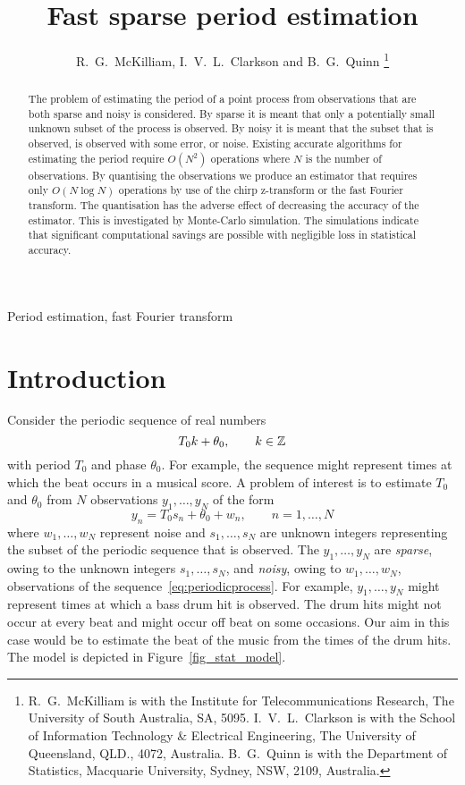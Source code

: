 \documentclass[10pt,twocolumn,twoside]{IEEEtran}
\title{Fast sparse period estimation}
\author{R.~G.~McKilliam, I.~V.~L.~Clarkson and B.~G.~Quinn    
\thanks{
R.~G.~McKilliam is with the Institute for Telecommunications Research, The University of South Australia, SA, 5095.  I.~V.~L.~Clarkson is with the School of Information Technology \& Electrical Engineering, The University of Queensland, QLD., 4072, Australia.  B.~G.~Quinn is with the Department of Statistics, Macquarie University, Sydney, NSW, 2109, Australia.
}}
\begin{document}
\maketitle

\begin{abstract}

The problem of estimating the period of a point process from observations that are both sparse and noisy is considered.  By sparse it is meant that only a potentially small unknown subset of the process is observed.  By noisy it is meant that the subset that is observed, is observed with some error, or noise.  Existing accurate algorithms for estimating the period require $O(N^2)$ operations where $N$ is the number of observations.  By quantising the observations we produce an estimator that requires only $O(N\log N)$ operations by use of the chirp z-transform or the fast Fourier transform.  The quantisation has the adverse effect of decreasing the accuracy of the estimator.  This is investigated by Monte-Carlo simulation.  The simulations indicate that significant computational savings are possible with negligible loss in statistical accuracy.

\end{abstract} 
\begin{IEEEkeywords}
Period estimation, fast Fourier transform
\end{IEEEkeywords}

\section{Introduction}

Consider the periodic sequence of real numbers
\begin{equation}\label{eq:periodicprocess}
T_0 k + \theta_0, \qquad k \in {\mathbb Z}
\end{equation}
with period $T_0$ and phase $\theta_0$.  For example, the sequence might represent times at which the beat occurs in a musical score.  A problem of interest is to estimate $T_0$ and $\theta_0$ from $N$ observations $y_1,\dots,y_N$ of the form
\begin{equation} \label{eq:sigmodel}
y_n = T_0 s_n + \theta_0 + w_n, \qquad n = 1,\dots,N
\end{equation}
where $w_1,\dots,w_N$ represent noise and $s_1,\dots,s_N$ are unknown integers representing the subset of the periodic sequence that is observed.  The $y_1, \dots, y_N$ are \emph{sparse}, owing to the unknown integers $s_1,\dots,s_N$, and \emph{noisy}, owing to $w_1,\dots,w_N$, observations of the sequence~\eqref{eq:periodicprocess}.  For example, $y_1,\dots,y_N$ might represent times at which a bass drum hit is observed.  The drum hits might not occur at every beat and might occur off beat on some occasions.  Our aim in this case would be to estimate the beat of the music from the times of the drum hits.  The model is depicted in Figure~\ref{fig_stat_model}. %
\end{document}
